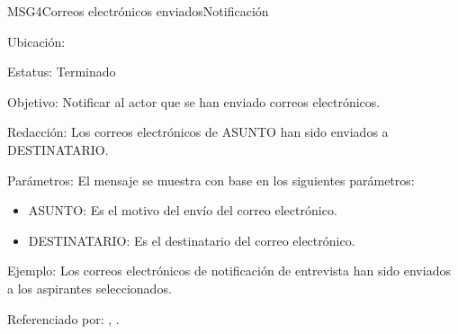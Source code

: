 \begin{mensaje}{MSG4}{Correos electrónicos enviados}{Notificación}
	\item[Ubicación:] \msjSuperior
	\item[Estatus:] Terminado
	\item[Objetivo:] Notificar al actor que se han enviado correos electrónicos.
	\item[Redacción:] Los correos electrónicos de ASUNTO han sido enviados a DESTINATARIO.
	\item[Parámetros:] El mensaje se muestra con base en los siguientes parámetros:
		\begin{itemize}
			\item ASUNTO: Es el motivo del envío del correo electrónico.
			\item DESTINATARIO: Es el destinatario del correo electrónico.
		\end{itemize}
	\item[Ejemplo:] Los correos electrónicos de notificación de entrevista han sido enviados a los aspirantes seleccionados.
	\item[Referenciado por:] ,
	.
\end{mensaje}

